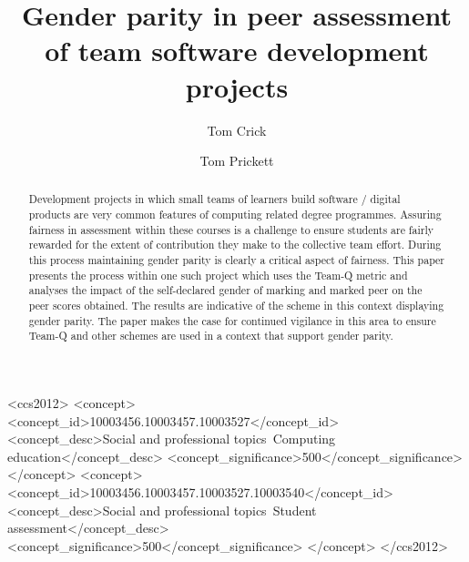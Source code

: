 \documentclass[sigconf, anonymous=true]{acmart}
\begin{document}
\title{Gender parity in peer assessment of team software development projects}

\author{Tom Crick}


\author{Tom Prickett}


\renewcommand{\shortauthors}{Crick and Prickett, et al.}

\begin{abstract}
  Development projects in which small teams of learners build software / digital products are very common features of computing related degree programmes. Assuring fairness in assessment within these courses is a challenge to ensure students are fairly rewarded for the extent of contribution they make to the collective team effort. During this process maintaining gender parity is clearly a critical aspect of fairness. This paper presents the process within one such project which uses the Team-Q metric \cite{Britton2017} and analyses the impact of the self-declared gender of marking and marked peer on the peer scores obtained. The results are indicative of the scheme in this context displaying gender parity.  The paper makes the case for continued vigilance in this area to ensure Team-Q and other schemes are used in a context that support gender parity.    
\end{abstract}

\begin{CCSXML}
<ccs2012>
   <concept>
       <concept_id>10003456.10003457.10003527</concept_id>
       <concept_desc>Social and professional topics~Computing education</concept_desc>
       <concept_significance>500</concept_significance>
       </concept>
   <concept>
       <concept_id>10003456.10003457.10003527.10003540</concept_id>
       <concept_desc>Social and professional topics~Student assessment</concept_desc>
       <concept_significance>500</concept_significance>
       </concept>
 </ccs2012>
\end{CCSXML}
\end{document}
